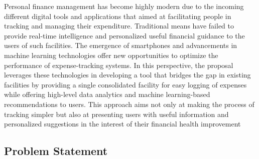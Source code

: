 \documentclass[12pt]{article}
\begin{document}
\noindent
\normalsize Personal finance management has become highly modern due to the incoming different digital tools and applications that aimed at facilitating people in tracking and managing their expenditure. Traditional means have failed to provide real-time intelligence and personalized useful financial guidance to the users of such facilities. The emergence of smartphones and advancements in machine learning technologies offer new opportunities to optimize the performance of expense-tracking systems.
In this perspective, the proposal leverages these technologies in developing a tool that bridges the gap in existing facilities by providing a single consolidated facility for easy logging of expenses while offering high-level data analytics and machine learning-based recommendations to users. This approach aims not only at making the process of tracking simpler but also at presenting users with useful information and personalized suggestions in the interest of their financial health improvement \cite{anitha2016easy}


\newpage



\noindent
\subsection{Problem Statement}

\vspace{0.5cm}
\end{document}

